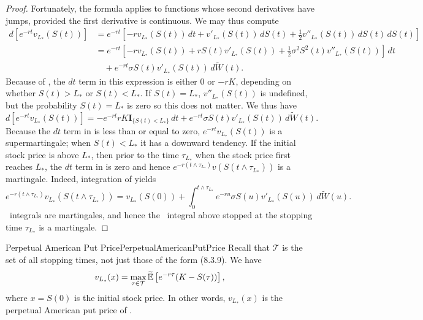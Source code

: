 \begin{proof}
	Fortunately, the \Ito{} formula applies to functions whose second derivatives have jumps, provided the first derivative is continuous. We may thus compute
	\begin{align*}
		d\left[e^{-rt}v_{L_*}(S(t))\right]
		 & = e^{-rt}\left[-rv_{L_*}(S(t)) \, dt + v'_{L_*}(S(t)) \, dS(t) + \frac{1}{2}v''_{L_*}(S(t)) \, dS(t) \, dS(t)\right] \\
		 & = e^{-rt}\left[-rv_{L_*}(S(t)) + rS(t)v'_{L_*}(S(t)) + \frac{1}{2}\sigma^2 S^2(t)v''_{L_*}(S(t))\right] \, dt        \\
		 & \quad + e^{-rt}\sigma S(t)v'_{L_*}(S(t)) \, d\widetilde{W}(t).
	\end{align*}
	Because of , the \(dt\) term in this expression is either \(0\) or \(-rK\), depending on whether \(S(t) > L_*\) or \(S(t) < L_*\). If \(S(t) = L_*\), \(v''_{L_*}(S(t))\) is undefined, but the probability \(S(t) = L_*\) is zero so this does not matter. We thus have
	\begin{equation} \label{eq:SupermartingaleDifferential}
		d\left[e^{-rt}v_{L_*}(S(t))\right] = -e^{-rt}rK\mathbf{I}_{\{S(t)<L_*\}} \, dt + e^{-rt}\sigma S(t)v'_{L_*}(S(t)) \, d\widetilde{W}(t).
	\end{equation}
	Because the \(dt\) term in  is less than or equal to zero, \(e^{-rt}v_{L_*}(S(t))\) is a supermartingale; when \(S(t) < L_*\) it has a downward tendency. If the initial stock price is above \(L_*\), then prior to the time \(\tau_{L_*}\) when the stock price first reaches \(L_*\), the \(dt\) term in  is zero and hence \(e^{-r(t \land \tau_{L_*})}v(S(t \land \tau_{L_*}))\) is a martingale. Indeed, integration of  yields
	\[
		e^{-r(t\land\tau_{L_*})}v_{L_*}(S(t \land \tau_{L_*})) = v_{L_*}(S(0)) + \int_0^{t\land\tau_{L_*}} e^{-ru}\sigma S(u)v'_{L_*}(S(u)) \, d\widetilde{W}(u).
	\]
	\Ito\ integrals are martingales, and hence the \Ito\ integral above stopped at the stopping time \(\tau_{L_*}\) is a martingale.
\end{proof}

\begin{cor}{Perpetual American Put Price}{PerpetualAmericanPutPrice}
	Recall that \(\mathcal{T}\) is the set of all stopping times, not just those of the form (8.3.9). We have
	\[
		v_{L_*}(x) = \max_{\tau \in \mathcal{T}} \widetilde{\mathbb{E}} \left[e^{-r\tau} (K - S(\tau))\right],
	\]
	where \(x = S(0)\) is the initial stock price. In other words, \(v_{L_*}(x)\) is the perpetual American put price of .
\end{cor}

